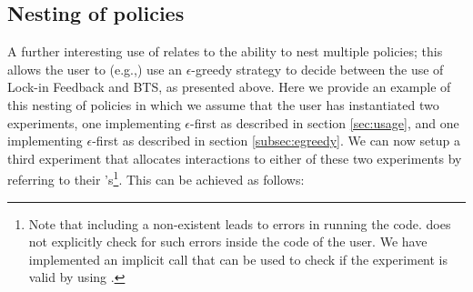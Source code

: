 \documentclass[nojss]{jss}
\begin{document}
\subsection{Nesting of policies}
\label{sec:nesting}

A further interesting use of  relates to the ability to nest multiple policies; this allows the user to (e.g.,) use an $\epsilon$-greedy strategy to decide between the use of Lock-in Feedback and BTS, as presented above. Here we provide an example of this nesting of policies in which we assume that the user has instantiated two experiments, one implementing $\epsilon$-first as described in section \ref{sec:usage}, and one implementing $\epsilon$-first as described in section \ref{subsec:egreedy}. We can now setup a third experiment that allocates interactions to either of these two experiments by referring to their 's\footnote{Note that including a non-existent  leads to errors in running the code.  does not explicitly check for such errors inside the code of the user. We have implemented an implicit call that can be used to check if the experiment is valid by using .}. This can be achieved as follows:
\end{document}
